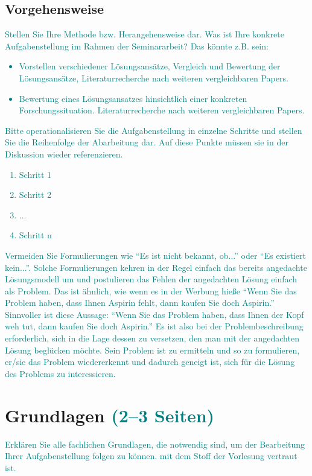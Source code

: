 \documentclass[headsepline,titlepage,twoside,12pt]{report}
\newcommand\todo[1]{\textcolor{teal}{#1}}%
\begin{document}
\section{Vorgehensweise}
\todo{
Stellen Sie Ihre Methode bzw. Herangehensweise dar.
Was ist Ihre konkrete Aufgabenstellung im Rahmen der Seminararbeit? Das könnte z.B. sein:
\begin{itemize}
\item Vorstellen verschiedener Lösungsansätze, Vergleich und Bewertung der Lösungsansätze, Literaturrecherche nach weiteren vergleichbaren Papers.
\item Bewertung eines Lösungsansatzes hinsichtlich einer konkreten Forschungssituation. Literaturrecherche nach weiteren vergleichbaren Papers.
\end{itemize}
}
\todo{
Bitte operationalisieren Sie die Aufgabenstellung in einzelne Schritte und stellen Sie die Reihenfolge der Abarbeitung dar. Auf diese Punkte müssen sie in der Diskussion wieder referenzieren.
}
\todo{
\begin{enumerate}
\item Schritt 1 
\item Schritt 2
\item ... 
\item Schritt n
\end{enumerate}
}
\todo{
Vermeiden Sie Formulierungen wie \enquote{Es ist nicht bekannt, ob...} oder \enquote{Es existiert kein...}.
Solche Formulierungen kehren in der Regel einfach das bereits angedachte Lösungsmodell um und postulieren das Fehlen der angedachten Lösung einfach als Problem.
Das ist ähnlich, wie wenn es in der Werbung hieße \enquote{Wenn Sie das Problem haben, dass Ihnen Aspirin fehlt, dann kaufen Sie doch Aspirin.}
Sinnvoller ist diese Aussage: \enquote{Wenn Sie das Problem haben, dass Ihnen der Kopf weh tut, dann kaufen Sie doch Aspirin.}
Es ist also bei der Problembeschreibung erforderlich, sich in die Lage dessen zu versetzen, den man mit der angedachten Lösung beglücken möchte.
Sein Problem ist zu ermitteln und so zu formulieren, er/sie das Problem wiedererkennt und dadurch geneigt ist, sich für die Lösung des Problems zu interessieren.
}

\chapter{Grundlagen \todo{(2--3 Seiten)}}
\todo{Erklären Sie alle fachlichen Grundlagen, die notwendig sind, um der Bearbeitung Ihrer Aufgabenstellung folgen zu können.
 mit dem Stoff der Vorlesung vertraut ist.
}
\end{document}

